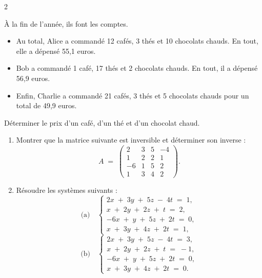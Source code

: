 \documentclass[a4paper,12pt]{article}
\begin{document}
\begin{multicols}{2}
\begin{exercice}[title=Exercice 16 $\star\star$ { [Modéliser, Calculer] }]{}{}
  À la fin de l’année, ils font les comptes.
  \begin{itemize}
    \item Au total, Alice a commandé 12 cafés, 3 thés et 10 chocolats chauds. En tout, elle a dépensé 55,1 euros.
    \item Bob a commandé 1 café, 17 thés et 2 chocolats chauds. En tout, il a dépensé 56,9 euros.
    \item Enfin, Charlie a commandé 21 cafés, 3 thés et 5 chocolats chauds pour un total de 49,9 euros.
  \end{itemize}

  Déterminer le prix d’un café, d’un thé et d’un chocolat chaud.
\end{exercice}

\begin{exercice}[title=Exercice 17 $\star\star$ { [Calculer] }]{}{}
  \begin{enumerate}
    \item Montrer que la matrice suivante est inversible et déterminer son inverse :
      \[
        A \;=\;
        \begin{pmatrix}
          2 & 3 & 5 & -4 \\[4pt]
          1 & 2 & 2 & 1 \\[4pt]
          -6 & 1 & 5 & 2 \\[4pt]
          1 & 3 & 4 & 2
        \end{pmatrix}.
      \]

    \item Résoudre les systèmes suivants :
      \[
        \text{(a)}\quad
        \begin{cases}
          2x \;+\; 3y \;+\; 5z \;-\; 4t \;=\; 1,\\[4pt]
          x \;+\; 2y \;+\; 2z \;+\; t \;=\; 2,\\[4pt]
          -6x \;+\; y \;+\; 5z \;+\; 2t \;=\; 0,\\[4pt]
          x \;+\; 3y \;+\; 4z \;+\; 2t \;=\; 1,
        \end{cases}
      \]
      \[
        \text{(b)}\quad
        \begin{cases}
          2x \;+\; 3y \;+\; 5z \;-\; 4t \;=\; 3,\\[4pt]
          x \;+\; 2y \;+\; 2z \;+\; t \;=\; -1,\\[4pt]
          -6x \;+\; y \;+\; 5z \;+\; 2t \;=\; 0,\\[4pt]
          x \;+\; 3y \;+\; 4z \;+\; 2t \;=\; 0.
        \end{cases}
      \]
  \end{enumerate}
\end{exercice}


\end{multicols}
\end{document}
